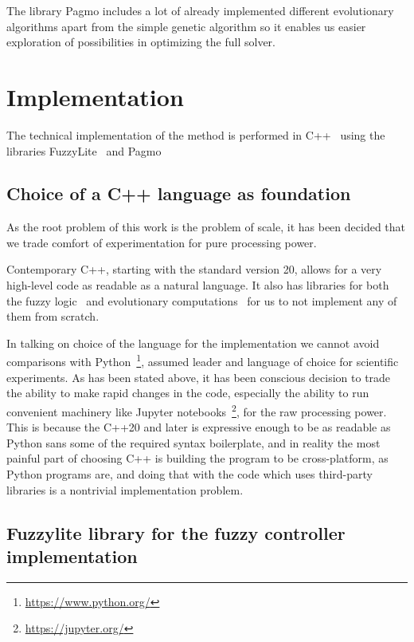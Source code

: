 \documentclass[12pt, a4paper]{report}
\begin{document}
	The library Pagmo \cite{Biscani2020} includes a lot of already implemented different evolutionary algorithms apart from the simple genetic algorithm so it enables us easier exploration of possibilities in optimizing the full solver.

	\chapter{Implementation}\label{chapter::implementation}

	The technical implementation of the method is performed in C++~\cite{ppp3} using the libraries FuzzyLite~\cite{fl::fuzzylite} and Pagmo~\cite{Biscani2020}

	\section{Choice of a C++ language as foundation}

	As the root problem of this work is the problem of scale, it has been decided that we trade comfort of experimentation for pure processing power.

	Contemporary C++, starting with the standard version 20, allows for a very high-level code as readable as a natural language.
  It also has libraries for both the fuzzy logic~\cite{fl::fuzzylite} and evolutionary computations~\cite{Biscani2020} for us to not implement any of them from scratch.

	In talking on choice of the language for the implementation we cannot avoid comparisons with Python~\footnote{\url{https://www.python.org/}}, assumed leader and language of choice for scientific experiments.
	As has been stated above, it has been conscious decision to trade the ability to make rapid changes in the code, especially the ability to run convenient machinery like Jupyter notebooks~\footnote{\url{https://jupyter.org/}}, for the raw processing power.
	This is because the C++20 and later is expressive enough to be as readable as Python sans some of the required syntax boilerplate, and in reality the most painful part of choosing C++ is building the program to be cross-platform, as Python programs are, and doing that with the code which uses third-party libraries is a nontrivial implementation problem.

	\section{Fuzzylite library for the fuzzy controller implementation}\label{fuzzy-implementation}
\end{document}
